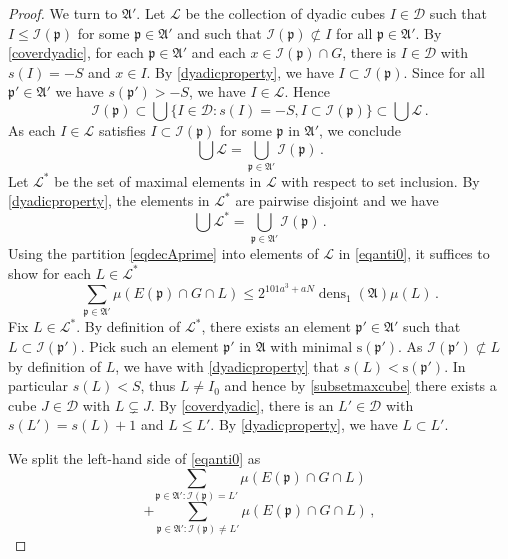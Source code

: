 \documentclass[10pt,a4paper]{article}
\theoremstyle{plain}
\theoremstyle{definition}
\numberwithin{equation}{subsection}
\DeclareMathOperator{\dens}{\operatorname{dens}}
\newcommand{\fp}{{\mathfrak p}}
\newcommand{\ps}{{\mathrm{s}}}
\newcommand{\scI}{{\mathcal{I}}} %
\begin{document}
\begin{proof}
We turn to $\mathfrak{A}'$.
Let $\mathcal{L}$ be the collection of dyadic cubes $I\in\mathcal{D}$ such that $I \le \scI(\fp)$
for some $\fp\in\mathfrak{A}'$ and such that $\scI(\fp)\not \subset I$ for all $\fp\in\mathfrak{A}'$.
By \eqref{coverdyadic}, for each $\fp \in \mathfrak{A}'$
and each $x\in \scI(\fp)\cap G$, there is $I\in \mathcal{D}$ with $s(I)=-S$ and $x\in I$.
By \eqref{dyadicproperty}, we have $I\subset \scI(\fp)$. Since for all $\fp' \in \mathfrak{A}'$ we
have $s(\fp') > -S$, we have $I \in \mathcal{L}$. Hence
\begin{equation}
    \scI(\fp)\subset \bigcup\{I\in \mathcal{D}: s(I)=-S, I\subset \scI(\fp)\}\subset \bigcup \mathcal{L}\, .
\end{equation}
As each $I\in \mathcal{L}$ satisfies $I\subset \scI(\fp)$ for some $\fp$ in $\mathfrak{A'}$, we conclude
\begin{equation}
    \bigcup\mathcal{L}=\bigcup_{\fp \in \mathfrak{A}'}\scI(\fp)\, .
\end{equation}
Let $\mathcal{L}^*$ be the set of maximal elements in $\mathcal{L}$ with respect to set inclusion.
By \eqref{dyadicproperty}, the elements in $\mathcal{L}^*$ are pairwise disjoint and we have
 \begin{equation}\label{eqdecAprime}
\bigcup\mathcal{L}^*=\bigcup_{\fp \in \mathfrak{A}'}\scI(\fp)\, .
   \end{equation}
Using the partition \eqref{eqdecAprime} into elements of $\mathcal{L}$ in \eqref{eqanti0}, it suffices to show for each $L\in \mathcal{L}^*$
\begin{equation}\label{eqanti0}
    \sum_{\fp\in\mathfrak{A}'}\mu(E(\fp)\cap G \cap L)
    \le
    2^{101a^3+aN}
    \dens_1(\mathfrak{A})\mu(L)\,.
\end{equation}
Fix $L\in \mathcal{L}^*$. By definition of $\mathcal{L}^*$, there exists an element $\fp'\in \mathfrak{A}'$
such that $L\subset \scI(\fp')$. Pick such an element $\fp'$ in $\mathfrak{A}$ with
minimal $\ps(\fp')$. As $\scI(\fp')\not \subset L$ by definition of $L$,
we have with \eqref{dyadicproperty} that $s(L)< \ps(\fp')$.
In particular $s(L)<S$, thus $L \ne I_0$ and hence by \eqref{subsetmaxcube}
there exists a cube $J \in \mathcal{D}$ with $L \subsetneq J$.
By \eqref{coverdyadic}, there is an $L'\in \mathcal{D}$ with $s(L')=s(L)+1$ and $L \le L'$.
By \eqref{dyadicproperty}, we have $L\subset L'$.

We split the left-hand side of \eqref{eqanti0} as
\begin{equation}\label{eqanti1}
    \sum_{\fp\in\mathfrak{A}':\scI(\fp)=L'}\mu(E(\fp)\cap G\cap L)
\end{equation}
\begin{equation}\label{eqanti2}
    +
     \sum_{\fp\in\mathfrak{A}':\scI(\fp)\neq L'}\mu(E(\fp)\cap G\cap L)\, ,
\end{equation}


\end{proof}
\end{document}
